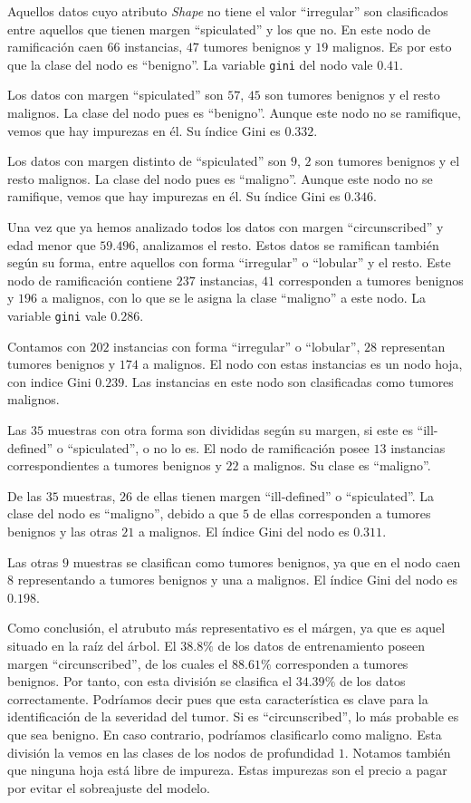 \documentclass[a4]{article}
\begin{document}
Aquellos datos cuyo atributo \textit{Shape} no tiene el valor ``irregular'' son clasificados entre aquellos que tienen margen ``spiculated'' y los que no. En este nodo de ramificación caen $66$ instancias, $47$ tumores benignos y $19$ malignos. Es por esto que la clase del nodo es ``benigno''. La variable \texttt{gini} del nodo vale $0.41$.

Los datos con margen ``spiculated'' son $57$, $45$ son tumores benignos y el resto malignos. La clase del nodo pues es ``benigno''. Aunque este nodo no se ramifique, vemos que hay impurezas en él. Su índice Gini es $0.332$.

Los datos con margen distinto de ``spiculated'' son $9$, $2$ son tumores benignos y el resto malignos. La clase del nodo pues es ``maligno''. Aunque este nodo no se ramifique, vemos que hay impurezas en él. Su índice Gini es $0.346$.

Una vez que ya hemos analizado todos los datos con margen ``circunscribed'' y edad menor que $59.496$, analizamos el resto. Estos datos se ramifican también según su forma, entre aquellos con forma ``irregular'' o ``lobular'' y el resto. Este nodo de ramificación contiene $237$ instancias, $41$ corresponden a tumores benignos y $196$ a malignos, con lo que se le asigna la clase ``maligno'' a este nodo. La variable \texttt{gini} vale $0.286$.

Contamos con $202$ instancias con forma ``irregular'' o ``lobular'', $28$ representan tumores benignos y $174$ a malignos. El nodo con estas instancias es un nodo hoja, con indice Gini $0.239$. Las instancias en este nodo son clasificadas como tumores malignos.

Las $35$ muestras con otra forma son divididas según su margen, si este es ``ill-defined'' o ``spiculated'', o no lo es. El nodo de ramificación posee $13$ instancias correspondientes a tumores benignos y $22$ a malignos. Su clase es ``maligno''.

De las $35$ muestras, $26$ de ellas tienen margen ``ill-defined'' o ``spiculated''. La clase del nodo es ``maligno'', debido a que $5$ de ellas corresponden a tumores benignos y las otras $21$ a malignos. El índice Gini del nodo es $0.311$.

Las otras $9$ muestras se clasifican como tumores benignos, ya que en el nodo caen $8$ representando a tumores benignos y una a malignos. El índice Gini del nodo es $0.198$.

Como conclusión, el atrubuto más representativo es el márgen, ya que es aquel situado en la raíz del árbol. El $38.8\%$ de los datos de entrenamiento poseen margen ``circunscribed'', de los cuales el $88.61\%$ corresponden a tumores benignos. Por tanto, con esta división se clasifica el $34.39\%$ de los datos correctamente. Podríamos decir pues que esta característica es clave para la identificación de la severidad del tumor. Si es ``circunscribed'', lo más probable es que sea benigno. En caso contrario, podríamos clasificarlo como maligno. Esta división la vemos en las clases de los nodos de profundidad $1$. Notamos también que ninguna hoja está libre de impureza. Estas impurezas son el precio a pagar por evitar el sobreajuste del modelo.
\end{document}
